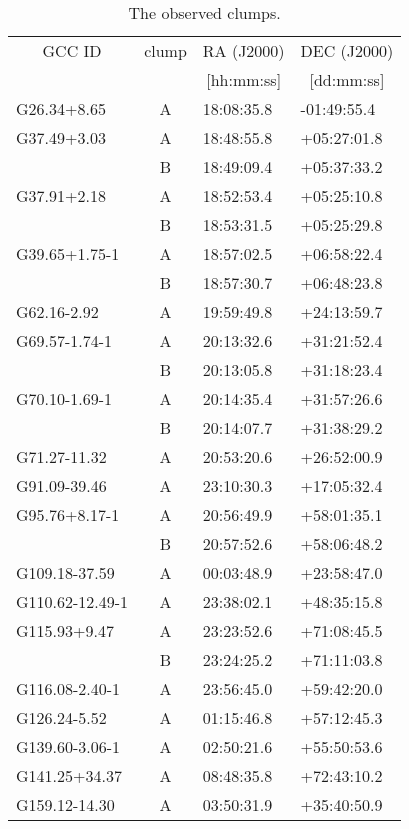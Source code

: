 \documentclass[printer]{aa}
\begin{document}
\begin{table}[t]
	\footnotesize
	\centering
		\caption{The observed clumps.}
		\begin{tabular}{l c l l}
		\hline
		\multicolumn{1}{c}{GCC ID} & \multicolumn{1}{c}{clump} & \multicolumn{1}{c}{RA (J2000)} & \multicolumn{1}{c}{DEC (J2000)} \\
		\multicolumn{1}{c}{\ } & \multicolumn{1}{c}{\ } & \multicolumn{1}{c}{[hh:mm:ss]} & \multicolumn{1}{c}{[dd:mm:ss]} \\
		\hline
		\hline
G26.34+8.65 & A & 18:08:35.8 & -01:49:55.4 \\
G37.49+3.03 & A & 18:48:55.8 & +05:27:01.8 \\
 & B & 18:49:09.4 & +05:37:33.2 \\
G37.91+2.18 & A & 18:52:53.4 & +05:25:10.8 \\
 & B & 18:53:31.5 & +05:25:29.8 \\
G39.65+1.75-1 & A & 18:57:02.5 & +06:58:22.4 \\
 & B & 18:57:30.7 & +06:48:23.8 \\
G62.16-2.92 & A & 19:59:49.8 & +24:13:59.7 \\
G69.57-1.74-1 & A & 20:13:32.6 & +31:21:52.4 \\
 & B & 20:13:05.8 & +31:18:23.4 \\
G70.10-1.69-1 & A & 20:14:35.4 & +31:57:26.6 \\
 & B & 20:14:07.7 & +31:38:29.2 \\
G71.27-11.32 & A & 20:53:20.6 & +26:52:00.9 \\
G91.09-39.46 & A & 23:10:30.3 & +17:05:32.4 \\
G95.76+8.17-1 & A & 20:56:49.9 & +58:01:35.1 \\
 & B & 20:57:52.6 & +58:06:48.2 \\
G109.18-37.59 & A & 00:03:48.9 & +23:58:47.0 \\
G110.62-12.49-1 & A & 23:38:02.1 & +48:35:15.8 \\
G115.93+9.47 & A & 23:23:52.6 & +71:08:45.5 \\
 & B & 23:24:25.2 & +71:11:03.8 \\
G116.08-2.40-1 & A & 23:56:45.0 & +59:42:20.0 \\
G126.24-5.52 & A & 01:15:46.8 & +57:12:45.3 \\
G139.60-3.06-1 & A & 02:50:21.6 & +55:50:53.6 \\
G141.25+34.37 & A & 08:48:35.8 & +72:43:10.2 \\
G159.12-14.30 & A & 03:50:31.9 & +35:40:50.9 \\

\end{tabular}
\end{table}
\end{document}
